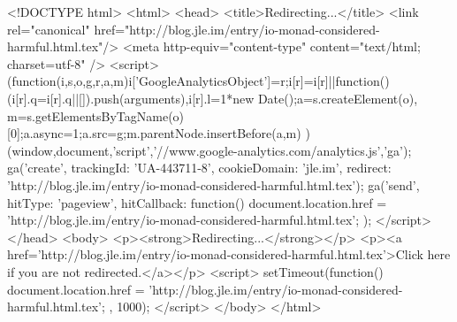 <!DOCTYPE html>
<html>
<head>
<title>Redirecting...</title>
<link rel="canonical" href="http://blog.jle.im/entry/io-monad-considered-harmful.html.tex"/>
<meta http-equiv="content-type" content="text/html; charset=utf-8" />
<script>
(function(i,s,o,g,r,a,m){i['GoogleAnalyticsObject']=r;i[r]=i[r]||function(){
(i[r].q=i[r].q||[]).push(arguments)},i[r].l=1*new Date();a=s.createElement(o),
m=s.getElementsByTagName(o)[0];a.async=1;a.src=g;m.parentNode.insertBefore(a,m)
})(window,document,'script','//www.google-analytics.com/analytics.js','ga');
ga('create', { trackingId: 'UA-443711-8', cookieDomain: 'jle.im', redirect: 'http://blog.jle.im/entry/io-monad-considered-harmful.html.tex'});
ga('send', { hitType: 'pageview', hitCallback: function() { document.location.href = 'http://blog.jle.im/entry/io-monad-considered-harmful.html.tex'; } });
</script>
</head>
<body>
  <p><strong>Redirecting...</strong></p>
  <p><a href='http://blog.jle.im/entry/io-monad-considered-harmful.html.tex'>Click here if you are not redirected.</a></p>
  <script>
    setTimeout(function() { document.location.href = 'http://blog.jle.im/entry/io-monad-considered-harmful.html.tex'; }, 1000);
  </script>
</body>
</html>
